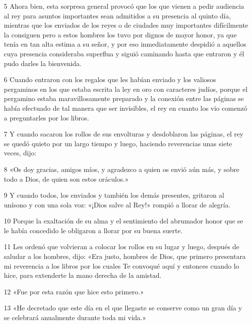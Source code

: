 \par 5 Ahora bien, esta sorpresa general provocó que los que vienen a pedir audiencia al rey para asuntos importantes sean admitidos a su presencia al quinto día, mientras que los enviados de los reyes o de ciudades muy importantes difícilmente la consiguen pero a estos hombres los tuvo por dignos de mayor honor, ya que tenía en tan alta estima a su señor, y por eso inmediatamente despidió a aquellos cuya presencia consideraba superflua y siguió caminando hasta que entraron y él pudo darles la bienvenida.

\par 6 Cuando entraron con los regalos que les habían enviado y los valiosos pergaminos en los que estaba escrita la ley en oro con caracteres judíos, porque el pergamino estaba maravillosamente preparado y la conexión entre las páginas se había efectuado de tal manera que ser invisibles, el rey en cuanto los vio comenzó a preguntarles por los libros.

\par 7 Y cuando sacaron los rollos de sus envolturas y desdoblaron las páginas, el rey se quedó quieto por un largo tiempo y luego, haciendo reverencias unas siete veces, dijo:

\par 8 «Os doy gracias, amigos míos, y agradezco a quien os envió aún más, y sobre todo a Dios, de quien son estos oráculos.»

\par 9 Y cuando todos, los enviados y también los demás presentes, gritaron al unísono y con una sola voz: «¡Dios salve al Rey!» rompió a llorar de alegría.

\par 10 Porque la exaltación de su alma y el sentimiento del abrumador honor que se le había concedido le obligaron a llorar por su buena suerte.

\par 11 Les ordenó que volvieran a colocar los rollos en su lugar y luego, después de saludar a los hombres, dijo: «Era justo, hombres de Dios, que primero presentara mi reverencia a los libros por los cuales Te convoqué aquí y entonces cuando lo hice, para extenderte la mano derecha de la amistad.

\par 12 «Fue por esta razón que hice esto primero.»

\par 13 «He decretado que este día en el que llegaste se conserve como un gran día y se celebrará anualmente durante toda mi vida.»

